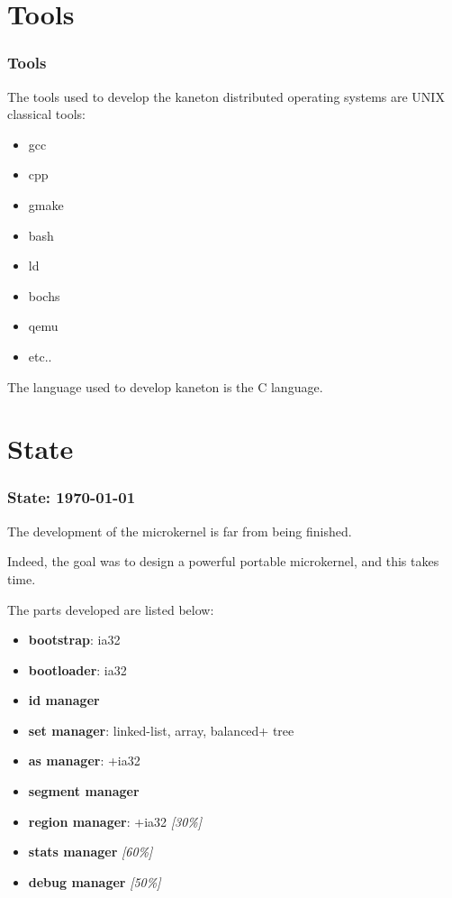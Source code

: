\documentclass[8pt]{beamer}
\newcommand{\nl}[0]{\vspace{0.4cm}}
\begin{document}
%
%

\section{Tools}


\begin{frame}
  \frametitle{Tools}

  The tools used to develop the kaneton distributed operating systems
  are UNIX classical tools:

  \begin{itemize}
    \item
      gcc
    \item
      cpp
    \item
      gmake
    \item
      bash
    \item
      ld
    \item
      bochs
    \item
      qemu
    \item
      etc..
  \end{itemize}

  \nl

  The language used to develop kaneton is the C language.
\end{frame}

%
%

\section{State}


\begin{frame}
  \frametitle{State: \textbf{\today}}

  The development of the microkernel is far from being finished.

  \nl

  Indeed, the goal was to design a powerful portable microkernel, and this
  takes time.

  \nl

  The parts developed are listed below:

  \begin{itemize}[<+->]
    \item
      \textbf{bootstrap}: ia32
    \item
      \textbf{bootloader}: ia32
    \item
      \textbf{id manager}
    \item
      \textbf{set manager}: linked-list, array, balanced+ tree
    \item
      \textbf{as manager}: +ia32
    \item
      \textbf{segment manager}
    \item
      \textbf{region manager}: +ia32 \textit{[30\%]}
    \item
      \textbf{stats manager} \textit{[60\%]}
    \item
      \textbf{debug manager} \textit{[50\%]}
  \end{itemize}
\end{frame}
\end{document}
